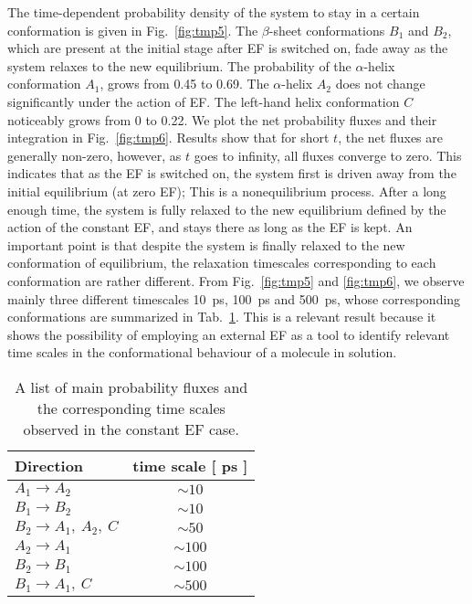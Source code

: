 \documentclass[a4paper,preprint,unsortedaddress,onecolumn]{revtex4-1}
\newcommand{\recheck}[1]{{\color{red} #1}}
\begin{document}
The time-dependent probability density of the system to stay in a certain
conformation is given in
Fig.~\ref{fig:tmp5}. The $\beta$-sheet conformations $B_1$ and $B_2$,
which are present at the initial stage after EF is switched on,
fade away as the system relaxes to the new equilibrium. The
probability of the $\alpha$-helix conformation $A_1$, grows from 0.45 to 0.69.
The $\alpha$-helix $A_2$  does not change significantly  under the action of EF.
The left-hand helix conformation $C$ noticeably grows from 0 to 0.22.
We plot the net probability fluxes and their integration in Fig.~\ref{fig:tmp6}.
Results show that for short $t$, the net fluxes are generally non-zero, however, 
as $t$ goes to infinity,
all fluxes converge to zero. This indicates
that as the EF is switched on, the system first is driven away from the initial
equilibrium (at zero EF);  This is a nonequilibrium process.
After a long enough time, the system
is fully relaxed to the new equilibrium defined by the action of the constant EF,
and stays there as long as the EF is kept.
\recheck{
An important point is that despite the system is finally relaxed to the new conformation of equilibrium,
the relaxation timescales corresponding to each conformation are rather different. 
From Fig.~\ref{fig:tmp5} and \ref{fig:tmp6}, we observe mainly
three different timescales 10~ps, 100~ps and 500~ps,
whose corresponding conformations are summarized in Tab.~\ref{tab:tmp1}.
This is a relevant result because it shows the possibility of employing an external EF as a tool to identify relevant time scales in the conformational behaviour of a molecule in solution.}

\begin{table}
  \centering
  \begin{tabular*}{0.4\textwidth}{@{\extracolsep{\fill}}lc}\hline\hline
    Direction        & time scale [ ps ] \\\hline
    $A_1\rightarrow A_2$        &       $\sim 10$      \\
    $B_1\rightarrow B_2$        &       $\sim 10$      \\    
    $B_2\rightarrow A_1,\ A_2,\ C$        &       $\sim 50$      \\    
    $A_2\rightarrow A_1$        &       $\sim 100$      \\
    $B_2\rightarrow B_1$        &       $\sim 100$      \\    
    $B_1\rightarrow A_1,\ C$        &       $\sim 500$      \\    \hline\hline
  \end{tabular*}
  \caption{A list of main probability fluxes and the corresponding time scales observed in the constant EF case.}
  \label{tab:tmp1}
\end{table}
\end{document}
